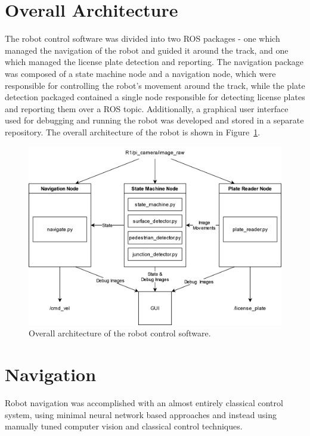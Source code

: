 \documentclass[titlepage, twocolumn]{article}
\begin{document}
\section{Overall Architecture}

    The robot control software was divided into two ROS packages - one which managed the navigation of the robot and guided it around the track, and one which managed the license plate detection and reporting. The navigation package was composed of a state machine node and a navigation node, which were responsible for controlling the robot's movement around the track, while the plate detection packaged contained a single node responsible for detecting license plates and reporting them over a ROS topic. Additionally, a graphical user interface used for debugging and running the robot was developed and stored in a separate repository. The overall architecture of the robot is shown in Figure~\ref{fig:architecture}. 

    \begin{figure}
        \includegraphics[width=\linewidth]{architecture.png}
        \caption{Overall architecture of the robot control software.}
        \label{fig:architecture}
    \end{figure}

\section{Navigation}
    Robot navigation was accomplished with an almost entirely classical control system, using minimal neural network based approaches and instead using manually tuned computer vision and classical control techniques. 
\end{document}

